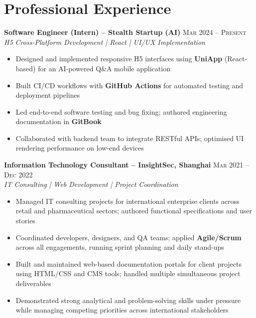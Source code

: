 \documentclass{simpleresume}
\begin{document}
\section{Professional Experience}
\noindent\textbf{Software Engineer (Intern) -- Stealth Startup (AI)}
  \hfill{\sffamily\scshape\small\color{muted}Mar 2024 -- Present}\\
  {\itshape\color{secondary}H5 Cross-Platform Development | React | UI/UX Implementation}
\vspace{-0.25mm}
\begin{itemize}
  \item Designed and implemented responsive H5 interfaces using \textbf{UniApp} (React-based) for an AI-powered Q\&A mobile application
  \item Built CI/CD workflows with \textbf{GitHub Actions} for automated testing and deployment pipelines
  \item Led end-to-end software testing and bug fixing; authored engineering documentation in \textbf{GitBook}
  \item Collaborated with backend team to integrate RESTful APIs; optimised UI rendering performance on low-end devices
\end{itemize}

\vspace{0.08cm}
\noindent\textbf{Information Technology Consultant -- InsightSec, Shanghai}
  \hfill{\sffamily\scshape\small\color{muted}Mar 2021 -- Dec 2022}\\
  {\itshape\color{secondary}IT Consulting | Web Development | Project Coordination}
\vspace{-0.25mm}
\begin{itemize}
  \item Managed IT consulting projects for international enterprise clients across retail and pharmaceutical sectors; authored functional specifications and user stories
  \item Coordinated developers, designers, and QA teams; applied \textbf{Agile/Scrum} across all engagements, running sprint planning and daily stand-ups
  \item Built and maintained web-based documentation portals for client projects using HTML/CSS and CMS tools; handled multiple simultaneous project deliverables
  \item Demonstrated strong analytical and problem-solving skills under pressure while managing competing priorities across international stakeholders
\end{itemize}
\end{document}
